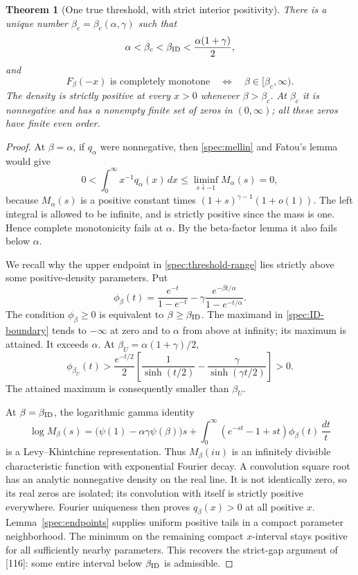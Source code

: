 \documentclass[11pt,a4paper]{article}
\newtheorem{theorem}{Theorem}[section]
\theoremstyle{definition}
\theoremstyle{remark}
\numberwithin{equation}{section}
\begin{document}
\begin{theorem}[One true threshold, with strict interior positivity]
\label{spec:threshold}
There is a unique number \(\beta_c=\beta_c(\alpha,\gamma)\) such that
\begin{equation}\label{spec:threshold-range}
 \alpha<\beta_c<\beta_{\rm ID}<\frac{\alpha(1+\gamma)}2,
\end{equation}
and
\[
 F_\beta(-x)\text{ is completely monotone}
       \quad\Longleftrightarrow\quad \beta\in[\beta_c,\infty).
\]
The density is strictly positive at every \(x>0\) whenever
\(\beta>\beta_c\).  At \(\beta_c\) it is nonnegative and has a
nonempty finite set of zeros in \((0,\infty)\); all these zeros
have finite even order.
\end{theorem}

\begin{proof}
At \(\beta=\alpha\), if \(q_\alpha\) were nonnegative, then
\eqref{spec:mellin} and Fatou's lemma would give
\[
 0<\int_0^\infty x^{-1}q_\alpha(x)\,dx
 \le\liminf_{s\downarrow-1}M_\alpha(s)=0,
\]
because \(M_\alpha(s)\) is a positive constant times
\((1+s)^{\gamma-1}(1+o(1))\).  The left integral is allowed to be
infinite, and is strictly positive since the mass is one.  Hence
complete monotonicity fails at \(\alpha\).  By the beta-factor lemma
it also fails below \(\alpha\).

We recall why the upper endpoint in \eqref{spec:threshold-range} lies
strictly above some positive-density parameters.  Put
\[
 \phi_\beta(t)=\frac{e^{-t}}{1-e^{-t}}
       -\gamma\frac{e^{-\beta t/\alpha}}{1-e^{-t/\alpha}}.
\]
The condition \(\phi_\beta\ge0\) is equivalent to
\(\beta\ge\beta_{\rm ID}\).  The maximand in
\eqref{spec:ID-boundary} tends to \(-\infty\) at zero and to
\(\alpha\) from above at infinity; its maximum is attained.
It exceeds \(\alpha\).  At \(\beta_U=\alpha(1+\gamma)/2\),
\[
 \phi_{\beta_U}(t)>
 \frac{e^{-t/2}}2\left[
  \frac1{\sinh(t/2)}-\frac\gamma{\sinh(\gamma t/2)}\right]>0.
\]
The attained maximum is consequently smaller than \(\beta_U\).

At \(\beta=\beta_{\rm ID}\), the logarithmic gamma identity
\[
 \log M_\beta(s)
  =\bigl(\psi(1)-\alpha\gamma\psi(\beta)\bigr)s
   +\int_0^\infty(e^{-st}-1+st)\phi_\beta(t)\,\frac{dt}{t}
\]
is a Levy--Khintchine representation.  Thus \(M_\beta(iu)\) is
an infinitely divisible characteristic function with exponential
Fourier decay.  A convolution square root has an analytic nonnegative
density on the real line.  It is not identically zero, so its real
zeros are isolated; its convolution with itself is strictly positive
everywhere.  Fourier uniqueness then proves \(q_\beta(x)>0\) at all
positive \(x\).  Lemma~\ref{spec:endpoints} supplies uniform positive
tails in a compact parameter neighborhood.  The minimum on the
remaining compact \(x\)-interval stays positive for all sufficiently
nearby parameters.  This recovers the strict-gap argument of [116]:
some entire interval below \(\beta_{\rm ID}\) is admissible.


\end{proof}
\end{document}
